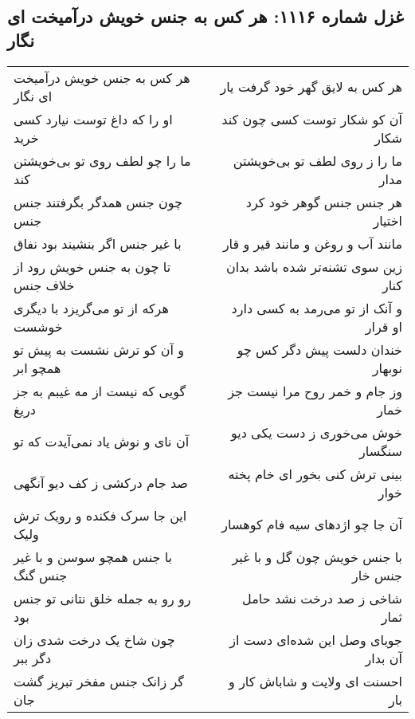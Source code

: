 \begin{center}
\section*{غزل شماره ۱۱۱۶: هر کس به جنس خویش درآمیخت ای نگار}
\label{sec:1116}
\begin{longtable}{l p{0.5cm} r}
هر کس به جنس خویش درآمیخت ای نگار
&&
هر کس به لایق گهر خود گرفت یار
\\
او را که داغ توست نیارد کسی خرید
&&
آن کو شکار توست کسی چون کند شکار
\\
ما را چو لطف روی تو بی‌خویشتن کند
&&
ما را ز روی لطف تو بی‌خویشتن مدار
\\
چون جنس همدگر بگرفتند جنس جنس
&&
هر جنس جنس گوهر خود کرد اختیار
\\
با غیر جنس اگر بنشیند بود نفاق
&&
مانند آب و روغن و مانند قیر و قار
\\
تا چون به جنس خویش رود از خلاف جنس
&&
زین سوی تشنه‌تر شده باشد بدان کنار
\\
هرکه از تو می‌گریزد با دیگری خوشست
&&
و آنک از تو می‌رمد به کسی دارد او قرار
\\
و آن کو ترش نشست به پیش تو همچو ابر
&&
خندان دلست پیش دگر کس چو نوبهار
\\
گویی که نیست از مه غیبم به جز دریغ
&&
وز جام و خمر روح مرا نیست جز خمار
\\
آن نای و نوش یاد نمی‌آیدت که تو
&&
خوش می‌خوری ز دست یکی دیو سنگسار
\\
صد جام درکشی ز کف دیو آنگهی
&&
بینی ترش کنی بخور ای خام پخته خوار
\\
این جا سرک فکنده و رویک ترش ولیک
&&
آن جا چو اژدهای سیه فام کوهسار
\\
با جنس همچو سوسن و با غیر جنس گنگ
&&
با جنس خویش چون گل و با غیر جنس خار
\\
رو رو به جمله خلق نتانی تو جنس بود
&&
شاخی ز صد درخت نشد حامل ثمار
\\
چون شاخ یک درخت شدی زان دگر ببر
&&
جویای وصل این شده‌ای دست از آن بدار
\\
گر زانک جنس مفخر تبریز گشت جان
&&
احسنت ای ولایت و شاباش کار و بار
\\
\end{longtable}
\end{center}
